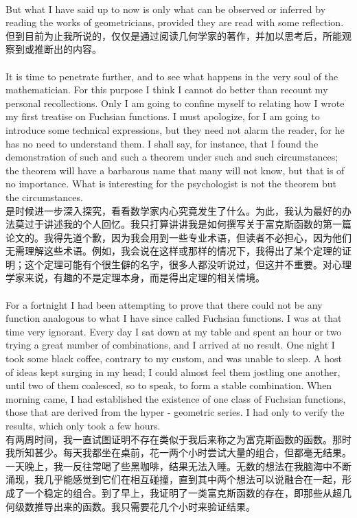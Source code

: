 \documentclass{article}
\begin{document}
\\
But what I have said up to now is only what can be observed or inferred by reading the works of geometricians, provided they are read with some reflection.\\
但到目前为止我所说的，仅仅是通过阅读几何学家的著作，并加以思考后，所能观察到或推断出的内容。\\ 

\\
It is time to penetrate further, and to see what happens in the very soul of the mathematician. For this purpose I think I cannot do better than recount my personal recollections. Only I am going to confine myself to relating how I wrote my first treatise on Fuchsian functions. I must apologize, for I am going to introduce some technical expressions, but they need not alarm the reader, for he has no need to understand them. I shall say, for instance, that I found the demonstration of such and such a theorem under such and such circumstances; the theorem will have a barbarous name that many will not know, but that is of no importance. What is interesting for the psychologist is not the theorem but the circumstances.\\
是时候进一步深入探究，看看数学家内心究竟发生了什么。为此，我认为最好的办法莫过于讲述我的个人回忆。我只打算讲讲我是如何撰写关于富克斯函数的第一篇论文的。我得先道个歉，因为我会用到一些专业术语，但读者不必担心，因为他们无需理解这些术语。例如，我会说在这样或那样的情况下，我得出了某个定理的证明；这个定理可能有个很生僻的名字，很多人都没听说过，但这并不重要。对心理学家来说，有趣的不是定理本身，而是得出定理的相关情境。\\ 

\\
For a fortnight I had been attempting to prove that there could not be any function analogous to what I have since called Fuchsian functions. I was at that time very ignorant. Every day I sat down at my table and spent an hour or two trying a great number of combinations, and I arrived at no result. One night I took some black coffee, contrary to my custom, and was unable to sleep. A host of ideas kept surging in my head; I could almost feel them jostling one another, until two of them coalesced, so to speak, to form a stable combination. When morning came, I had established the existence of one class of Fuchsian functions, those that are derived from the hyper - geometric series. I had only to verify the results, which only took a few hours.\\
有两周时间，我一直试图证明不存在类似于我后来称之为富克斯函数的函数。那时我所知甚少。每天我都坐在桌前，花一两个小时尝试大量的组合，但都毫无结果。一天晚上，我一反往常喝了些黑咖啡，结果无法入睡。无数的想法在我脑海中不断涌现，我几乎能感觉到它们在相互碰撞，直到其中两个想法可以说融合在一起，形成了一个稳定的组合。到了早上，我证明了一类富克斯函数的存在，即那些从超几何级数推导出来的函数。我只需要花几个小时来验证结果。 \\
\end{document}

